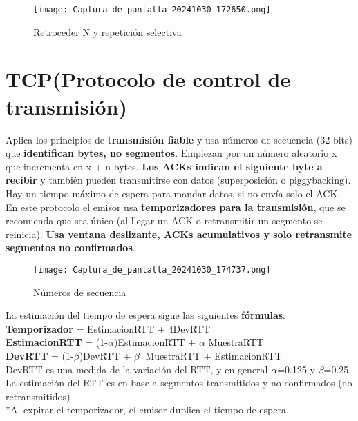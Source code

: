 \documentclass{article}
\begin{document}
\begin{figure}[h]
    \centering
    \texttt{[image: Captura\_de\_pantalla\_20241030\_172650.png]} %
    \caption{Retroceder N y repetición selectiva}
    \label{fig:etiqueta}
\end{figure}


\section{TCP(Protocolo de control de transmisión)}
Aplica los principios de \textbf{transmisión fiable} y usa números de secuencia (32 bits) que \textbf{identifican bytes, no segmentos}. Empiezan por un número aleatorio x que incrementa en x + n bytes. \textbf{Los ACKs indican el siguiente byte a recibir} y también pueden transmitirse con datos (superposición o piggybacking). Hay un tiempo máximo de espera para mandar datos, si no envía solo el ACK. \\

En este protocolo el emisor usa \textbf{temporizadores para la transmisión}, que se recomienda que sea único (al llegar un ACK o retransmitir un segmento se reinicia). \textbf{Usa ventana deslizante, ACKs acumulativos y solo retransmite segmentos no confirmados}. \\

\begin{figure}[h]
    \centering
    \texttt{[image: Captura\_de\_pantalla\_20241030\_174737.png]} %
    \caption{Números de secuencia}
    \label{fig:etiqueta}
\end{figure}

\newpage

La estimación del tiempo de espera sigue las siguientes \textbf{fórmulas}: \\
\textbf{Temporizador} = EstimacionRTT + 4DevRTT \\
\textbf{EstimacionRTT} = (1-$\alpha$)EstimacionRTT + $\alpha$ MuestraRTT \\
\textbf{DevRTT} = (1-$\beta$)DevRTT + $\beta$ $|$MuestraRTT + EstimacionRTT$|$ \\
DevRTT es una medida de la variación del RTT, y en general $\alpha$=0.125 y $\beta$=0.25  \\
La estimación del RTT es en base a  segmentos transmitidos y no confirmados (no retransmitidos) \\
*Al expirar el temporizador, el emisor duplica el tiempo de espera.\\
\end{document}
